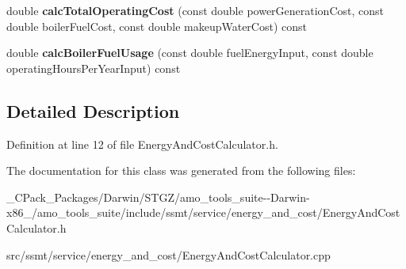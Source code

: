\begin{DoxyCompactItemize}
\item 
\mbox{\label{class_energy_and_cost_calculator_aa9148a6587edea63d784dba51cbfca9b}} 
double {\bfseries calc\+Total\+Operating\+Cost} (const double power\+Generation\+Cost, const double boiler\+Fuel\+Cost, const double makeup\+Water\+Cost) const
\item 
\mbox{\label{class_energy_and_cost_calculator_a24bf5affb772d9db90af9f95cf737f17}} 
double {\bfseries calc\+Boiler\+Fuel\+Usage} (const double fuel\+Energy\+Input, const double operating\+Hours\+Per\+Year\+Input) const
\end{DoxyCompactItemize}


\subsection{Detailed Description}


Definition at line 12 of file Energy\+And\+Cost\+Calculator.\+h.



The documentation for this class was generated from the following files\+:\begin{DoxyCompactItemize}
\item 
\+\_\+\+C\+Pack\+\_\+\+Packages/\+Darwin/\+S\+T\+G\+Z/amo\+\_\+tools\+\_\+suite-\/-\/\+Darwin-\/x86\+\_/amo\+\_\+tools\+\_\+suite/include/ssmt/service/energy\+\_\+and\+\_\+cost/Energy\+And\+Cost\+Calculator.\+h\item 
src/ssmt/service/energy\+\_\+and\+\_\+cost/Energy\+And\+Cost\+Calculator.\+cpp\end{DoxyCompactItemize}
